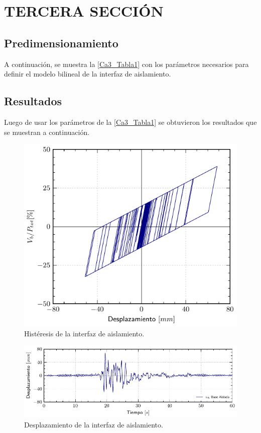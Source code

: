 \section{TERCERA SECCIÓN}

\lipsum[10]
	
	\subsection{Predimensionamiento}

A continuación, se muestra la \autoref{Ca3_Tabla1} con los parámetros necesarios para definir el modelo bilineal de la interfaz de aislamiento.


	\subsection{Resultados} \label{subsection:Resul}

\lipsum[11]

Luego de usar los parámetros de la \autoref{Ca3_Tabla1} se obtuvieron los resultados que se muestran a continuación.
	
		\begin{figure}[!h]
	\centering
		\includegraphics[scale=1]{E_IMAGENES/2_Capitulo3/Cap3_Imagen4.pdf}
		\vspace{-3 mm}
	\caption[Histéresis de la interfaz de aislamiento]{\centering\footnotesize Histéresis de la interfaz de aislamiento.}
	\label{Cap3_Figura4}
	\end{figure}
	

		\begin{figure}[!h]
	\centering
		\includegraphics[scale=1]{E_IMAGENES/2_Capitulo3/Cap3_Imagen5.pdf}
		\vspace{-3 mm}
	\caption[Desplazamiento de la interfaz de aislamiento]{\centering\footnotesize Desplazamiento de la interfaz de aislamiento.}
	\label{Cap3_Figura5}
	\end{figure}
		

